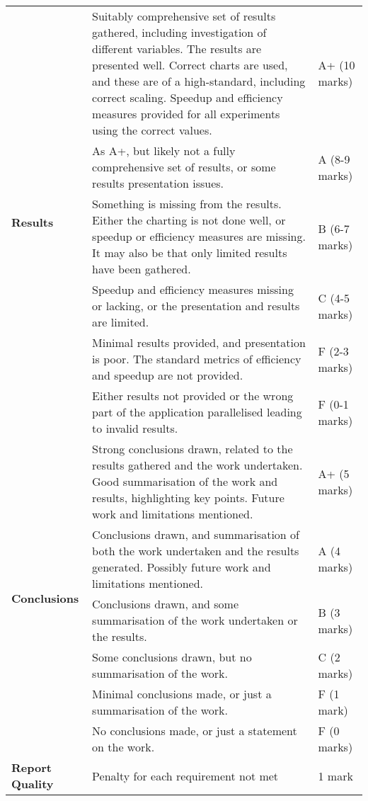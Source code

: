 \documentclass[a4paper, 12pt]{article}
\begin{document}
\begin{table}[H]
\begin{tabularx}{\textwidth}{|l|X|l|}
		\hline
		\multirow{6}{*}{\textbf{Results}} & Suitably comprehensive set of results gathered, including investigation of different variables. The results are presented well. Correct charts are used, and these are of a high-standard, including correct scaling. Speedup and efficiency measures provided for all experiments using the correct values. & A+ (10 marks) \\
		\cline{2-3}
		& As A+, but likely not a fully comprehensive set of results, or some results presentation issues. & A (8-9 marks) \\
		\cline{2-3}
		& Something is missing from the results. Either the charting is not done well, or speedup or efficiency measures are missing. It may also be that only limited results have been gathered. & B (6-7 marks) \\
		\cline{2-3}
		& Speedup and efficiency measures missing or lacking, or the presentation and results are limited. & C (4-5 marks) \\
		\cline{2-3}
		& Minimal results provided, and presentation is poor. The standard metrics of efficiency and speedup are not provided. & F (2-3 marks) \\
		\cline{2-3}
		& Either results not provided or the wrong part of the application parallelised leading to invalid results. & F (0-1 marks) \\
		\hline
		\multirow{6}{*}{\textbf{Conclusions}} & Strong conclusions drawn, related to the results gathered and the work undertaken. Good summarisation of the work and results, highlighting key	points. Future work and limitations mentioned. & A+ (5 marks) \\
		\cline{2-3}
		& Conclusions drawn, and summarisation of both the work undertaken and the results generated. Possibly future work and limitations mentioned. & A (4 marks) \\
		\cline{2-3}
		& Conclusions drawn, and some summarisation of the work undertaken or the results. & B (3 marks) \\
		\cline{2-3} 
		& Some conclusions drawn, but no summarisation of the work. & C (2 marks) \\
		\cline{2-3}
		& Minimal conclusions made, or just a summarisation of the work. & F (1 mark) \\
		\cline{2-3}
		& No conclusions made, or just a statement on the work. & F (0 marks) \\
		\hline
		\multirow{6}{*}{\textbf{Report Quality}} & Penalty for each requirement not met & 1 mark \\

\end{tabularx}
\end{table}
\end{document}
